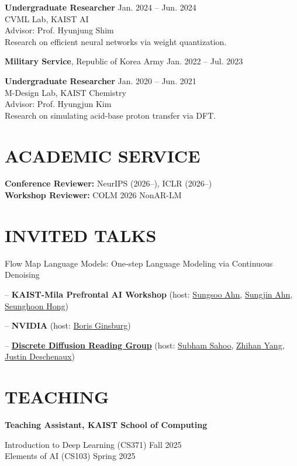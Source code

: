 \documentclass[a4paper,10pt]{extarticle}
\newcommand{\entryskip}{\smallskip}
\begin{document}
\entryskip
\textbf{Undergraduate Researcher} \hfill Jan. 2024 -- Jun. 2024 \\
CVML Lab, KAIST AI \\
Advisor: Prof. Hyunjung Shim \\
Research on efficient neural networks via weight quantization.

\entryskip
\textbf{Military Service}, Republic of Korea Army \hfill Jan. 2022 -- Jul. 2023

\entryskip
\textbf{Undergraduate Researcher} \hfill Jan. 2020 -- Jun. 2021 \\
M-Design Lab, KAIST Chemistry \\
Advisor: Prof. Hyungjun Kim \\
Research on simulating acid-base proton transfer via DFT.

\section*{ACADEMIC SERVICE}
\textbf{Conference Reviewer:} NeurIPS (2026--), ICLR (2026--) \\
\textbf{Workshop Reviewer:} COLM 2026 NonAR-LM

\section*{INVITED TALKS}
Flow Map Language Models: One-step Language Modeling via Continuous Denoising

\quad -- \textbf{KAIST-Mila Prefrontal AI Workshop} (host: \href{https://sungsoo-ahn.github.io/}{Sungsoo Ahn}, \href{https://mlml.kaist.ac.kr/sungjinahn}{Sungjin Ahn}, \href{https://maga33.github.io/}{Seunghoon Hong})

\quad -- \textbf{NVIDIA} (host: \href{https://scholar.google.com/citations?user=7BRYaGcAAAAJ&hl=en}{Boris Ginsburg})

\quad -- \href{https://d-llms.com/}{\textbf{Discrete Diffusion Reading Group}} (host: \href{https://s-sahoo.com/}{Subham Sahoo}, \href{https://zhihanyang2022.github.io/}{Zhihan Yang}, \href{https://jdeschena.com/}{Justin Deschenaux})

\section*{TEACHING}
\textbf{Teaching Assistant, KAIST School of Computing}

Introduction to Deep Learning (CS371) \hfill Fall 2025 \\
Elements of AI (CS103) \hfill Spring 2025
\end{document}
